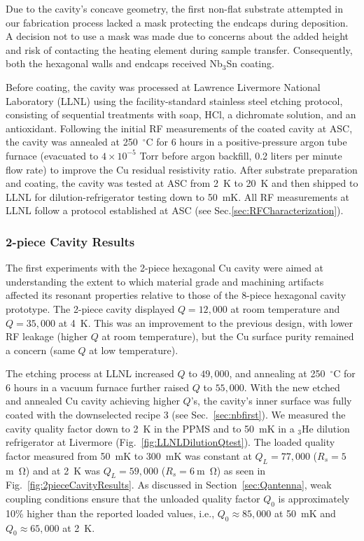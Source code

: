     
    

    
    Due to the cavity's concave geometry, the first non-flat substrate attempted in our fabrication process lacked a mask protecting the endcaps during deposition. A decision not to use a mask was made due to concerns about the added height and risk of contacting the heating element during sample transfer. Consequently, both the hexagonal walls and endcaps received Nb$_3$Sn coating.
    
    Before coating, the cavity was processed at Lawrence Livermore National Laboratory (LLNL) using the facility-standard stainless steel etching protocol, consisting of sequential treatments with soap, HCl, a dichromate solution, and an antioxidant. Following the initial RF measurements of the coated cavity at ASC, the cavity was annealed at 250~$^\circ$C for 6 hours in a positive-pressure argon tube furnace (evacuated to $4\times10^{-5}$ Torr before argon backfill, 0.2 liters per minute flow rate) to improve the Cu residual resistivity ratio. After substrate preparation and coating, the cavity was tested at ASC from 2~K to 20~K and then shipped to LLNL for dilution-refrigerator testing down to 50~mK. All RF measurements at LLNL follow a protocol established at ASC (see Sec.\ref{sec:RFCharacterization}).

    \subsubsection{2-piece Cavity Results}
    
    The first experiments with the 2-piece hexagonal Cu cavity were aimed at understanding the extent to which material grade and machining artifacts affected its resonant properties relative to those of the 8-piece hexagonal cavity prototype. The 2-piece cavity displayed $Q=12,000$ at room temperature and $Q=35,000$ at 4~K. This was an improvement to the previous design, with lower RF leakage (higher $Q$ at room temperature), but the Cu surface purity remained a concern (same $Q$ at low temperature).
    
    The etching process at LLNL increased $Q$ to $49,000$, and annealing at 250~$^\circ$C for 6 hours in a vacuum furnace further raised $Q$ to $55,000$. With the new etched and annealed Cu cavity achieving higher $Q$'s, the cavity's inner surface was fully coated with the downselected recipe 3 (see Sec.~\ref{sec:nbfirst}). We measured the cavity quality factor down to 2~K in the PPMS and to 50~mK in a $_3$He dilution refrigerator at Livermore (Fig.~\ref{fig:LLNLDilutionQtest}). The loaded quality factor measured from 50~mK to 300~mK was constant at $Q_L=77,000$ ($R_s=5~$\unit{m\ohm}) and at 2~K was $Q_L=59,000$ ($R_s=6~$\unit{m\ohm}) as seen in Fig.~\ref{fig:2pieceCavityResults}. As discussed in Section~\ref{sec:Qantenna}, weak coupling conditions ensure that the unloaded quality factor $Q_0$ is approximately 10\% higher than the reported loaded values, i.e., $Q_0 \approx 85{,}000$ at 50~mK and $Q_0 \approx 65{,}000$ at 2~K.

